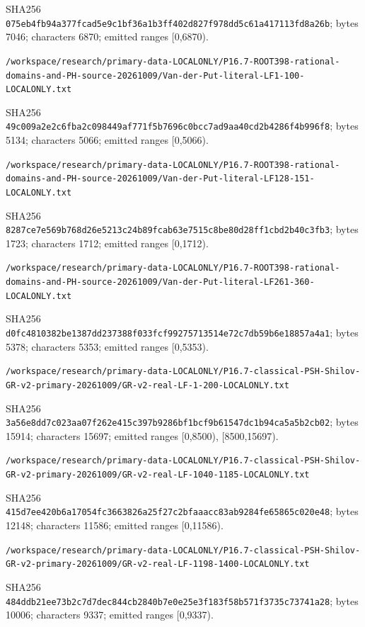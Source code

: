 \documentclass[11pt]{article}
\begin{document}
SHA256 \texttt{075eb4fb94a377fcad5e9c1bf36a1b3ff402d827f978dd5c61a417113fd8a26b}; bytes 7046; characters 6870; emitted ranges [0,6870).

\texttt{/\allowbreak workspace/\allowbreak research/\allowbreak primary-data-LOCALONLY/\allowbreak P16.7-ROOT398-rational-domains-and-PH-source-20261009/\allowbreak Van-der-Put-literal-LF1-100-LOCALONLY.txt}

SHA256 \texttt{49c009a2e2c6fba2c098449af771f5b7696c0bcc7ad9aa40cd2b4286f4b996f8}; bytes 5134; characters 5066; emitted ranges [0,5066).

\texttt{/\allowbreak workspace/\allowbreak research/\allowbreak primary-data-LOCALONLY/\allowbreak P16.7-ROOT398-rational-domains-and-PH-source-20261009/\allowbreak Van-der-Put-literal-LF128-151-LOCALONLY.txt}

SHA256 \texttt{8287ce7e569b768d26e5213c24b89fcab63e7515c8be80d28ff1cbd2b40c3fb3}; bytes 1723; characters 1712; emitted ranges [0,1712).

\texttt{/\allowbreak workspace/\allowbreak research/\allowbreak primary-data-LOCALONLY/\allowbreak P16.7-ROOT398-rational-domains-and-PH-source-20261009/\allowbreak Van-der-Put-literal-LF261-360-LOCALONLY.txt}

SHA256 \texttt{d0fc4810382be1387dd237388f033fcf99275713514e72c7db59b6e18857a4a1}; bytes 5378; characters 5353; emitted ranges [0,5353).

\texttt{/\allowbreak workspace/\allowbreak research/\allowbreak primary-data-LOCALONLY/\allowbreak P16.7-classical-PSH-Shilov-GR-v2-primary-20261009/\allowbreak GR-v2-real-LF-1-200-LOCALONLY.txt}

SHA256 \texttt{3a56e8dd7c023aa07f262e415c397b9286bf1bcf9b61547dc1b94ca5a5b2cb02}; bytes 15914; characters 15697; emitted ranges [0,8500), [8500,15697).

\texttt{/\allowbreak workspace/\allowbreak research/\allowbreak primary-data-LOCALONLY/\allowbreak P16.7-classical-PSH-Shilov-GR-v2-primary-20261009/\allowbreak GR-v2-real-LF-1040-1185-LOCALONLY.txt}

SHA256 \texttt{415d7ee420b6a17054fc3663826a25f27c2bfaaacc83ab9284fe65865c020e48}; bytes 12148; characters 11586; emitted ranges [0,11586).

\texttt{/\allowbreak workspace/\allowbreak research/\allowbreak primary-data-LOCALONLY/\allowbreak P16.7-classical-PSH-Shilov-GR-v2-primary-20261009/\allowbreak GR-v2-real-LF-1198-1400-LOCALONLY.txt}

SHA256 \texttt{484ddb21ee73b2c7d7dec844cb2840b7e0e25e3f183f58b571f3735c73741a28}; bytes 10006; characters 9337; emitted ranges [0,9337).
\end{document}
